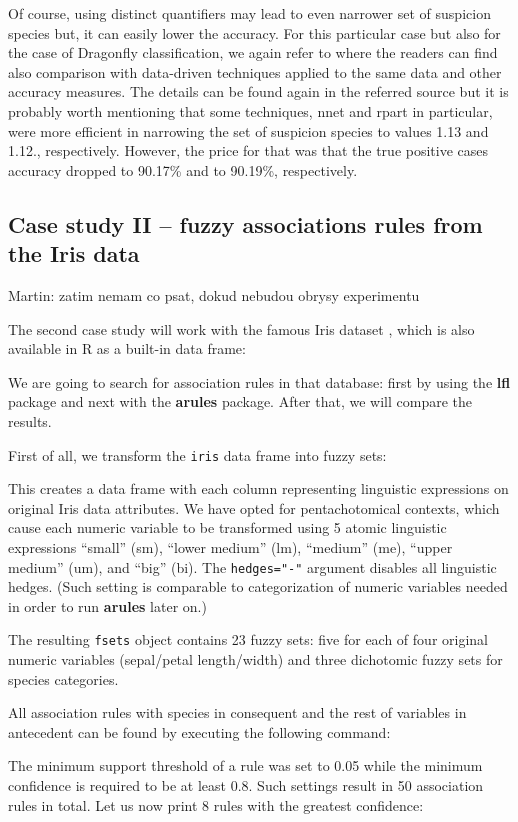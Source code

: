 \documentclass[review]{elsarticle}
\newcommand{\pkg}[1]{\textbf{#1}}
\newcommand{\proglang}[1]{#1}
\newcommand{\lfl}{\pkg{lfl}}
\newcommand{\R}{\proglang{R}}
\newcommand{\Martin}[1]{{\color{blue} Martin: #1}}
\begin{document}
Of course, using distinct quantifiers may lead to even narrower set of suspicion species but, it can easily lower the accuracy. For this particular case but also for the case of Dragonfly classification, we again refer to \cite{Step_etal:Unavoidable_KNOSYS2020} where the readers can find also comparison with data-driven techniques applied to the same data and other accuracy measures. The details can be found again in the referred source but it is probably worth mentioning that some techniques, nnet and rpart in particular, were more efficient in narrowing the set of suspicion species to values 1.13 and 1.12., respectively. However, the price for that was that the true positive cases accuracy dropped to 90.17\% and to 90.19\%, respectively. 


\subsection{Case study II -- fuzzy associations rules from the Iris data}


\Martin{zatim nemam co psat, dokud nebudou obrysy experimentu}

The second case study will work with the famous Iris dataset \citep{iris1, iris2}, which is also available in \R{} as a built-in data frame:
%

%
We are going to search for association rules in that database: first by using the \lfl{} package and next with the \pkg{arules} package. After that, we will compare the results.

First of all, we transform the \texttt{iris} data frame into fuzzy sets:
%

%
This creates a data frame with each column representing linguistic expressions on original Iris data attributes. We have opted for pentachotomical contexts, which cause each numeric variable to be transformed using 5 atomic linguistic expressions ``small'' (sm), ``lower medium'' (lm), ``medium'' (me), ``upper medium'' (um), and ``big'' (bi). The \texttt{hedges="-"} argument disables all linguistic hedges. (Such setting is comparable to categorization of numeric variables needed in order to run \pkg{arules} later on.)

The resulting \texttt{fsets} object contains 23 fuzzy sets: five for each of four original numeric variables (sepal/petal length/width) and three dichotomic fuzzy sets for species categories.

All association rules with species in consequent and the rest of variables in antecedent can be found by executing the following command:
%

%
The minimum support threshold of a rule was set to 0.05 while the minimum confidence is required to be at least 0.8. Such settings result in 50 association rules in total. Let us now print 8 rules with the greatest confidence:
%

%
%
\end{document}

